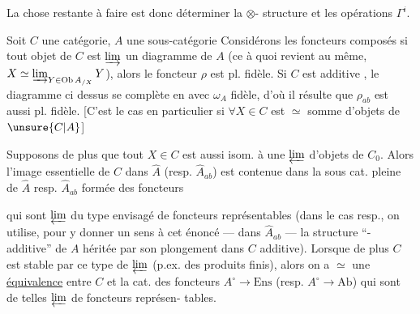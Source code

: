 La chose restante à faire
est donc déterminer la $\otimes$-
structure et les opérations $\Gamma^i$.

Soit $C$ une catégorie, $A$ une sous-catégorie
 Considérons les foncteurs composés
si  tout objet  de $C$ est
$\varinjlim$  un diagramme de $A$ (ce à
quoi revient au même, $X\simeq\varinjlim_{Y\in\operatorname{Ob}A_{/X}}Y$),
alors le foncteur $\rho$ est pl. fidèle.
Si $C$ est additive , le diagramme ci
dessus se complète en
avec $\omega_A$ fidèle, d'où il résulte
que $\rho_{ab}$ est aussi pl. fidèle.
[C'est le cas en particulier si $\forall X\in C$
est $\simeq$ somme d'objets de $\unsure{C|A}$]

Supposons de plus que tout
$X\in C$ est aussi isom. à une $\varprojlim$
 d'objets de $C_0$. Alors l'image essentielle
de $C$ dans $\widehat A$ (resp. $\widehat A_{ab}$)
est contenue dans la sous cat. pleine
de $\widehat A$ resp. $\widehat A_{ab}$ formée des foncteurs

qui sont $\varprojlim$ du type envisagé de
foncteurs représentables (dans le
cas resp., on utilise, pour y donner
un sens à cet énoncé --- dans $\widehat A_{ab}$ ---
la structure ``-additive'' de $A$
héritée par son plongement dans $C$
additive). Lorsque de plus $C$
est stable par ce type de $\varprojlim$
(p.ex. des produits finis), alors
on a $\simeq$ une \uline{équivalence} entre
$C$ et la cat. des foncteurs
$A^\circ\longrightarrow\mathrm{Ens}$ (resp. $A^\circ\longrightarrow\mathrm{Ab}$) qui sont
de telles $\varprojlim$ de foncteurs représen-
tables.
\deleted{[Si p.ex. $A$ est réduite à
un objet, \unsure{on trouve donc $C$}
($C$ additive, en resp., si $\forall$ objet}

